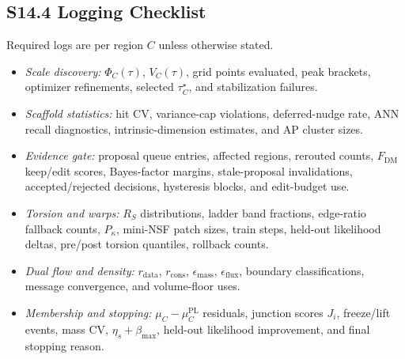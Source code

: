 \documentclass[11pt]{article}
\begin{document}
\subsection*{S14.4 Logging Checklist}
Required logs are per region $C$ unless otherwise stated.
\begin{itemize}[leftmargin=1.5em]
  \item \emph{Scale discovery:} $\Phi_C(\tau)$, $V_C(\tau)$, grid points evaluated, peak brackets, optimizer refinements, selected $\tau_C^\star$, and stabilization failures.
  \item \emph{Scaffold statistics:} hit CV, variance-cap violations, deferred-nudge rate, ANN recall diagnostics, intrinsic-dimension estimates, and AP cluster sizes.
  \item \emph{Evidence gate:} proposal queue entries, affected regions, rerouted counts, $F_{\mathrm{DM}}$ keep/edit scores, Bayes-factor margins, stale-proposal invalidations, accepted/rejected decisions, hysteresis blocks, and edit-budget use.
  \item \emph{Torsion and warps:} $R_S$ distributions, ladder band fractions, edge-ratio fallback counts, $P_\kappa$, mini-NSF patch sizes, train steps, held-out likelihood deltas, pre/post torsion quantiles, rollback counts.
  \item \emph{Dual flow and density:} $r_{\mathrm{data}}$, $r_{\mathrm{cons}}$, $\epsilon_{\mathrm{mass}}$, $\epsilon_{\mathrm{flux}}$, boundary classifications, message convergence, and volume-floor uses.
  \item \emph{Membership and stopping:} $\mu_C-\mu_C^{\mathrm{PL}}$ residuals, junction scores $J_i$, freeze/lift events, mass CV, $\eta_s+\beta_{\max}$, held-out likelihood improvement, and final stopping reason.
\end{itemize}
\end{document}
